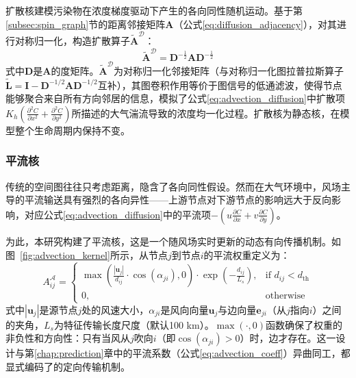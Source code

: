 扩散核建模污染物在浓度梯度驱动下产生的各向同性随机运动。基于第\ref{subsec:spin_graph}节的距离邻接矩阵$\mathbf{A}$（公式\eqref{eq:diffusion_adjacency}），对其进行对称归一化，构造扩散算子$\tilde{\mathbf{A}}^{\mathcal{D}}$：
\begin{equation}
    \tilde{\mathbf{A}}^{\mathcal{D}} = \mathbf{D}^{-\frac{1}{2}} \mathbf{A} \mathbf{D}^{-\frac{1}{2}}
\label{eq:diffusion_normalized}
\end{equation}
\noindent 式中$\mathbf{D}$是$\mathbf{A}$的度矩阵。$\tilde{\mathbf{A}}^{\mathcal{D}}$为对称归一化邻接矩阵（与对称归一化图拉普拉斯算子$\tilde{\mathbf{L}} = \mathbf{I} - \mathbf{D}^{-1/2}\mathbf{A}\mathbf{D}^{-1/2}$互补），其图卷积作用等价于图信号的低通滤波\citep{kipf2017semi}，使得节点能够聚合来自所有方向邻居的信息，模拟了公式\eqref{eq:advection_diffusion}中扩散项$K_h\left(\frac{\partial^2 C}{\partial x^2} + \frac{\partial^2 C}{\partial y^2}\right)$所描述的大气湍流导致的浓度均一化过程。扩散核为静态核，在模型整个生命周期内保持不变。


\subsubsection{平流核}

传统的空间图往往只考虑距离，隐含了各向同性假设。然而在大气环境中，风场主导的平流输送具有强烈的各向异性——上游节点对下游节点的影响远大于反向影响，对应公式\eqref{eq:advection_diffusion}中的平流项$-\left(u\frac{\partial C}{\partial x} + v\frac{\partial C}{\partial y}\right)$。

为此，本研究构建了平流核，这是一个随风场实时更新的动态有向传播机制。如图~\ref{fig:advection_kernel}所示，从节点$j$到节点$i$的平流权重定义为：
\begin{equation}
    A_{ij}^{\mathcal{A}} = \begin{cases}
        \max\left( \frac{|\mathbf{u}_j|}{d_{ij}} \cdot \cos(\alpha_{ji}), 0 \right) \cdot \exp\left(-\frac{d_{ij}}{L_s}\right), & \text{if } d_{ij} < d_{\text{th}} \\
        0, & \text{otherwise}
    \end{cases}
\label{eq:advection_adjacency}
\end{equation}
\noindent 式中$|\mathbf{u}_j|$是源节点$j$处的风速大小，$\alpha_{ji}$是风向向量$\mathbf{u}_j$与边向量$\mathbf{e}_{ji}$（从$j$指向$i$）之间的夹角，$L_s$为特征传输长度尺度（默认100 km）。$\max(\cdot, 0)$函数确保了权重的非负性和方向性：只有当风从$j$吹向$i$（即$\cos(\alpha_{ji}) > 0$）时，边才存在。这一设计与第\ref{chap:prediction}章\ModelPred{}中的平流系数（公式\eqref{eq:advection_coeff}）异曲同工，都显式编码了的定向传输机制。

